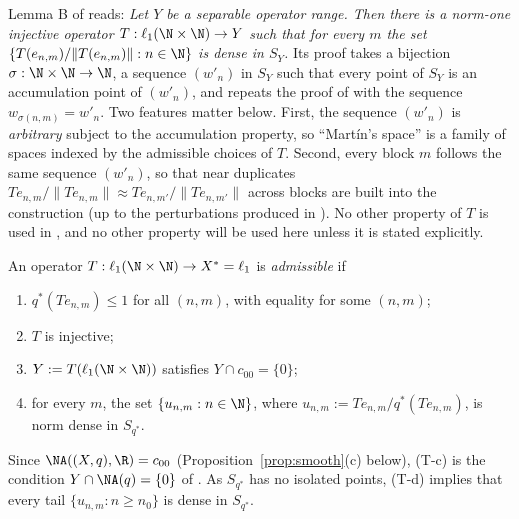\begin{remark}\label{rem:lemmaB}
Lemma B of \cite{Martin} reads: \emph{Let $Y$ be a separable operator
range.  Then there is a norm-one injective operator
$T:\ell_1(\N\times\N)\to Y$ such that for every $m$ the set
$\{T(e_{n,m})/\|T(e_{n,m})\|:n\in\N\}$ is dense in $S_Y$.}
Its proof takes a bijection $\sigma:\N\times\N\to\N$, a sequence
$(w'_n)$ in $S_Y$ such that every point of $S_Y$ is an accumulation point
of $(w'_n)$, and repeats the proof of \cite[Proposition~2.8]{KLMW20} with
the sequence $w_{\sigma(n,m)}=w'_n$.  Two features matter below.  First,
the sequence $(w'_n)$ is \emph{arbitrary} subject to the accumulation
property, so ``Mart\'in's space'' is a family of spaces indexed by the
admissible choices of $T$.  Second, every block $m$ follows the same
sequence $(w'_n)$, so that near duplicates $Te_{n,m}/\|Te_{n,m}\|\approx
Te_{n,m'}/\|Te_{n,m'}\|$ across blocks are built into the construction (up
to the perturbations produced in \cite{KLMW20}).  No other property of $T$
is used in \cite{Martin}, and no other property will be used here unless
it is stated explicitly.
\end{remark}

\begin{definition}\label{def:admissible}
An operator $T:\ell_1(\N\times\N)\to X^*=\ell_1$ is \emph{admissible} if
\begin{enumerate}
\item[(T-a)] $q^*(Te_{n,m})\le1$ for all $(n,m)$, with equality for some
$(n,m)$;
\item[(T-b)] $T$ is injective;
\item[(T-c)] $Y:=T(\ell_1(\N\times\N))$ satisfies $Y\cap c_{00}=\{0\}$;
\item[(T-d)] for every $m$, the set $\{u_{n,m}:n\in\N\}$, where
$u_{n,m}:=Te_{n,m}/q^*(Te_{n,m})$, is norm dense in $S_{q^*}$.
\end{enumerate}
\end{definition}

Since $\NA((X,q),\R)=c_{00}$ (Proposition~\ref{prop:smooth}(c) below),
(T-c) is the condition $Y\cap\NA(q)=\{0\}$ of \cite{Martin}.  As $S_{q^*}$
has no isolated points, (T-d) implies that every tail
$\{u_{n,m}:n\geq n_0\}$ is dense in $S_{q^*}$.

